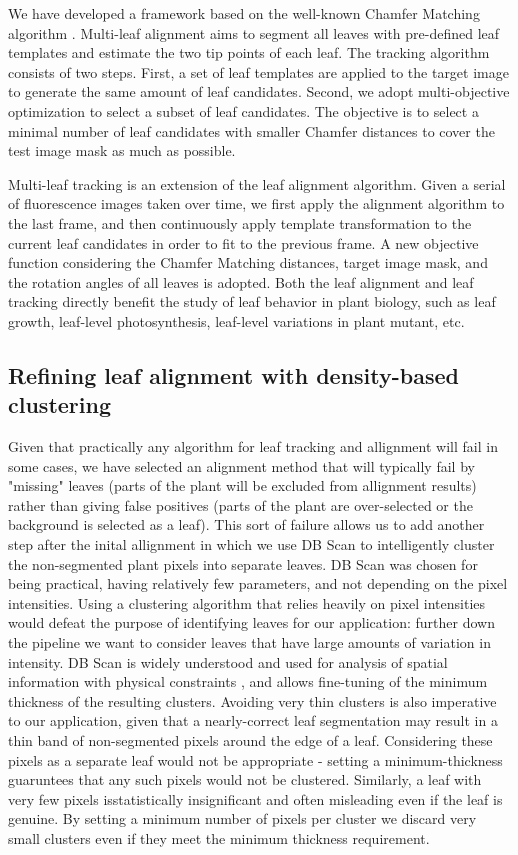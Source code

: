 \documentclass{bioinfo}
\begin{document}
We have developed a framework based on the well-known Chamfer Matching algorithm \citep{yin2014}. Multi-leaf alignment aims to segment all leaves with pre-defined leaf templates and estimate the two tip points of each leaf. The tracking algorithm consists of two steps. First, a set of leaf templates are applied to the target image to generate the same amount of leaf candidates. Second, we adopt multi-objective optimization to select a subset of leaf candidates. The objective is to select a minimal number of leaf candidates with smaller Chamfer distances to cover the test image mask as much as possible.

Multi-leaf tracking is an extension of the leaf alignment algorithm. Given a serial of fluorescence images  taken over time, we first apply the alignment algorithm to the last frame, and then continuously apply template transformation to the current leaf candidates in order to fit to the previous frame. A new objective function considering the Chamfer Matching distances, target image mask, and the rotation angles of all leaves is adopted.
%
Both the leaf alignment and leaf tracking directly benefit the study of leaf behavior in plant biology, such as leaf growth, leaf-level photosynthesis, leaf-level variations in plant mutant, etc.

\subsection{Refining leaf alignment with density-based clustering}

Given that practically any algorithm for leaf tracking and allignment will fail in some cases, we have selected an alignment method that will typically fail by "missing" leaves (parts of the plant will be excluded from allignment results) rather than giving false positives (parts of the plant are over-selected or the background is selected as a leaf). This sort of failure allows us to add another step after the inital allignment in which we use DB Scan \citep{kriegel2011density} to intelligently cluster the non-segmented plant pixels into separate leaves. DB Scan was chosen for being practical, having relatively few parameters, and not depending on the pixel intensities. Using a clustering algorithm that relies heavily on pixel intensities would defeat the purpose of identifying leaves for our application: further down the pipeline we want to consider leaves that have large amounts of variation in intensity. DB Scan is widely understood and used for analysis of spatial information with physical constraints \citep{zaiane2002clustering}, and allows fine-tuning of the minimum thickness of the resulting clusters. Avoiding very thin clusters is also imperative to our application, given that a nearly-correct leaf segmentation may result in a thin band of non-segmented pixels around the edge of a leaf. Considering these pixels as a separate leaf would not be appropriate - setting a minimum-thickness guaruntees that any such pixels would not be clustered. Similarly, a leaf with very few pixels isstatistically insignificant and often misleading even if the leaf is genuine. By setting a minimum number of pixels per cluster we discard very small clusters even if they meet the minimum thickness requirement.
\end{document}
